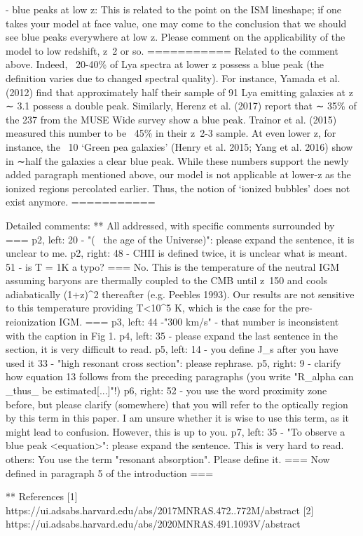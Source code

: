 - blue peaks at low z:
This is related to the point on the ISM lineshape; if one takes your model at face value, one may come to the conclusion that we should see blue peaks everywhere at low z. Please comment on the applicability of the model to low redshift, z~2 or so.
===========
Related to the comment above. Indeed, ~20-40\% of Lya spectra at lower z possess a blue peak (the definition varies due to changed spectral quality). For instance,  Yamada et al. (2012) find that approximately half their sample of 91 Lya emitting galaxies at z ∼ 3.1 possess a double peak.  Similarly, Herenz et al. (2017) report that ∼ 35\% of the 237 from the MUSE Wide survey show a blue peak. Trainor et al. (2015) measured this number to be  ~45\% in their z~2-3 sample.
At even lower z, for instance, the ~10 `Green pea galaxies' (Henry et al. 2015; Yang et al. 2016) show in ∼half the galaxies a clear blue peak.
While these numbers support the newly added paragraph mentioned above, our model is not applicable at lower-z as the ionized regions percolated earlier. Thus, the notion of `ionized bubbles' does not exist anymore.
===========

Detailed comments:
    ** All addressed, with specific comments surrounded by ===
p2, left:
20 - "(~ the age of the Universe)": please expand the sentence, it is unclear to me.
p2, right:
48 - CHII is defined twice, it is unclear what is meant.
51 - is T = 1K a typo?
=== No. This is the temperature of the neutral IGM assuming baryons are thermally coupled to the CMB until z~150 and cools adiabatically (1+z)^2 thereafter (e.g. Peebles 1993). Our results are not sensitive to this temperature providing T<10^5 K, which is the case for the pre-reionization IGM. ===
p3, left:
44 -"300 km/s" - that number is inconsistent with the caption in Fig 1.
p4, left:
35 - please expand the last sentence in the section, it is very difficult to read.
p5, left:
14 - you define J_s after you have used it
33 - "high resonant cross section": please rephrase.
p5, right:
9 - clarify how equation 13 follows from the preceding paragraphs (you write "R_alpha can _thus_ be estimated[...]"!)
p6, right:
52 - you use the word proximity zone before, but please clarify (somewhere) that you will refer to the optically region by this term in this paper. I am unsure whether it is wise to use this term, as it might lead to confusion. However, this is up to you.
p7, left:
35 - "To observe a blue peak <equation>": please expand the sentence. This is very hard to read.
others:
You use the term "resonant absorption". Please define it.
=== Now defined in paragraph 5 of the introduction ===

** References
[1] https://ui.adsabs.harvard.edu/abs/2017MNRAS.472..772M/abstract
[2] https://ui.adsabs.harvard.edu/abs/2020MNRAS.491.1093V/abstract
